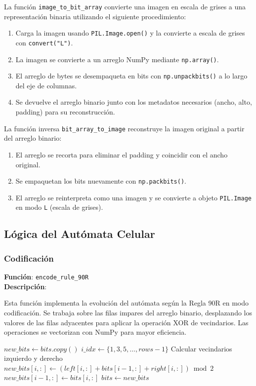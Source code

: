 La funci\'on \texttt{image\_to\_bit\_array} convierte una imagen en escala de grises a una representaci\'on binaria utilizando el siguiente procedimiento:
\begin{enumerate}
\item Carga la imagen usando \texttt{PIL.Image.open()} y la convierte a escala de grises con \texttt{convert("L")}.
\item La imagen se convierte a un arreglo NumPy mediante \texttt{np.array()}.
\item El arreglo de bytes se desempaqueta en bits con \texttt{np.unpackbits()} a lo largo del eje de columnas.
\item Se devuelve el arreglo binario junto con los metadatos necesarios (ancho, alto, padding) para su reconstrucci\'on.
\end{enumerate}

La funci\'on inversa \texttt{bit\_array\_to\_image} reconstruye la imagen original a partir del arreglo binario:
\begin{enumerate}
\item El arreglo se recorta para eliminar el padding y coincidir con el ancho original.
\item Se empaquetan los bits nuevamente con \texttt{np.packbits()}.
\item El arreglo se reinterpreta como una imagen y se convierte a objeto \texttt{PIL.Image} en modo \texttt{L} (escala de grises).
\end{enumerate}

\subsection{L\'ogica del Aut\'omata Celular}
\subsubsection{Codificaci\'on}
\textbf{Funci\'on}: \texttt{encode\_rule\_90R}\\
\textbf{Descripci\'on}:

Esta funci\'on implementa la evoluci\'on del aut\'omata seg\'un la Regla 90R en modo codificaci\'on. Se trabaja sobre las filas impares del arreglo binario, desplazando los valores de las filas adyacentes para aplicar la operaci\'on XOR de vecindarios. Las operaciones se vectorizan con NumPy para mayor eficiencia.

\begin{algorithm}[H]
\caption{Algoritmo de Codificaci\'on Regla 90R}
\begin{algorithmic}[1]
\STATE $new\_bits \gets bits.copy()$
\STATE $i\_idx \gets \{1, 3, 5, \ldots, rows-1\}$ 
\STATE Calcular vecindarios izquierdo y derecho
\STATE $new\_bits[i, :] \gets (left[i, :] + bits[i-1, :] + right[i, :]) \bmod 2$
\STATE $new\_bits[i-1, :] \gets bits[i, :]$
\ENDFOR
\STATE $bits \gets new\_bits$
\ENDFOR
\end{algorithmic}
\end{algorithm}

